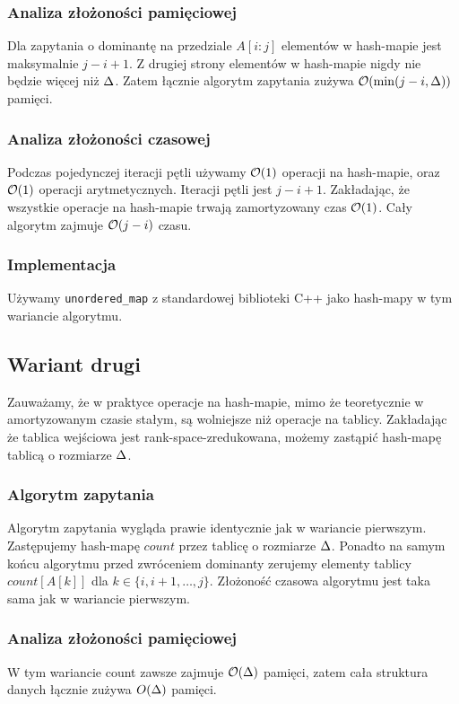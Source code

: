 \subsubsection{Analiza złożoności pamięciowej}
Dla zapytania o dominantę na przedziale $A[i:j]$ elementów w hash-mapie jest maksymalnie $j-i+1$. Z drugiej strony elementów w hash-mapie nigdy nie będzie więcej niż $\Delta$. Zatem łącznie algorytm zapytania zużywa $\mathcal{O}(\min(j-i, \Delta))$ pamięci.
\subsubsection{Analiza złożoności czasowej}
Podczas pojedynczej iteracji pętli używamy $\mathcal{O}(1)$ operacji na hash-mapie, oraz $\mathcal{O}(1)$  operacji arytmetycznych. Iteracji pętli jest $j-i+1$. Zakładając, że wszystkie operacje na hash-mapie trwają zamortyzowany czas $\mathcal{O}(1)$. Cały algorytm zajmuje $\mathcal{O}(j-i)$ czasu.
\subsubsection{Implementacja}
Używamy \lstinline{unordered_map} z standardowej biblioteki C++ jako hash-mapy w tym wariancie algorytmu.
\subsection{Wariant drugi}
Zauważamy, że w praktyce operacje na hash-mapie, mimo że teoretycznie w amortyzowanym czasie stałym, są wolniejsze niż operacje na tablicy. Zakładając że tablica wejściowa jest rank-space-zredukowana, możemy zastąpić hash-mapę tablicą o rozmiarze $\Delta$.
\subsubsection{Algorytm zapytania}
Algorytm zapytania wygląda prawie identycznie jak w wariancie pierwszym. Zastępujemy hash-mapę $count$ przez tablicę o rozmiarze $\Delta$. Ponadto na samym końcu algorytmu przed zwróceniem dominanty zerujemy elementy tablicy $count[A[k]]$ dla $k \in \{i, i+1, \dots, j\}$. Złożoność czasowa algorytmu jest taka sama jak w wariancie pierwszym.
\subsubsection{Analiza złożoności pamięciowej}
W tym wariancie count zawsze zajmuje $\mathcal{O}(\Delta)$ pamięci, zatem cała struktura danych łącznie zużywa $O(\Delta)$ pamięci.